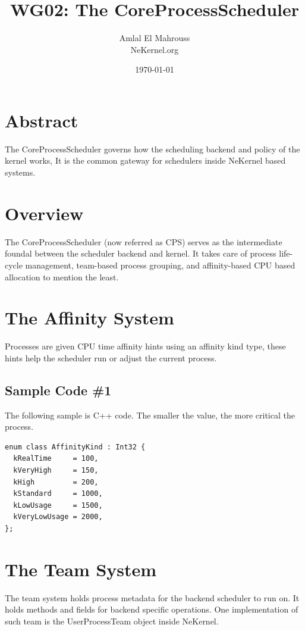 \documentclass{article}
\title{WG02: The CoreProcessScheduler}
\author{Amlal El Mahrouss\\NeKernel.org}
\date{\today}
\begin{document}
\maketitle

\section{Abstract}

{The CoreProcessScheduler governs how the scheduling backend and policy of the kernel works, It is the common gateway for schedulers inside NeKernel based systems.}

\section{Overview}

{The CoreProcessScheduler (now referred as CPS) serves as the intermediate foundal between the scheduler backend and kernel.} {It takes care of process life-cycle management, team-based process grouping, and affinity-based CPU based allocation to mention the least.}

\section{The Affinity System}

{Processes are given CPU time affinity hints using an affinity kind type, these hints help the scheduler run or adjust the current process.}

\subsection{Sample Code \#1}

{The following sample is C++ code.} {The smaller the value, the more critical the process.}

\begin{verbatim}
enum class AffinityKind : Int32 {
  kRealTime     = 100,
  kVeryHigh     = 150,
  kHigh         = 200,
  kStandard     = 1000,
  kLowUsage     = 1500,
  kVeryLowUsage = 2000,
};
\end{verbatim}

\section{The Team System}

{The team system holds process metadata for the backend scheduler to run on. It holds methods and fields for backend specific operations.} {One implementation of such team is the UserProcessTeam object inside NeKernel.}
\end{document}
